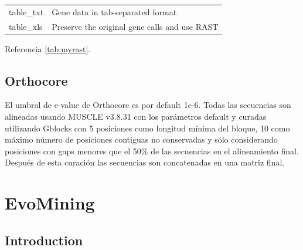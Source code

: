 \documentclass[12pt,twoside]{reedthesis}
\begin{document}
\begin{longtable}[]{@{}ll@{}}
  \begin{minipage}[t]{0.22\columnwidth}\raggedright\strut
  table\_txt\strut
  \end{minipage} & \begin{minipage}[t]{0.72\columnwidth}\raggedright\strut
  Gene data in tab-separated format\strut
  \end{minipage}\tabularnewline
  \begin{minipage}[t]{0.22\columnwidth}\raggedright\strut
  table\_xls\strut
  \end{minipage} & \begin{minipage}[t]{0.72\columnwidth}\raggedright\strut
  Preserve the original gene calls and use RAST\strut
  \end{minipage}\tabularnewline
  \bottomrule
  \end{longtable}
  
  Referencia \autoref{tab:myrast}.
  
  \section{Orthocore}\label{orthocore}
  
  El umbral de e-value de Orthocore es por default 1e-6. Todas las
  secuencias son alineadas usando MUSCLE v3.8.31 con los parámetros
  default y curadas utilizando Gblocks con 5 posiciones como longitud
  mínima del bloque, 10 como máximo número de posiciones contiguas no
  conservadas y sólo considerando posiciones con gaps menores que el 50\%
  de las secuencias en el alineamiento final. Después de esta curación las
  secuencias son concatenadas en una matriz final.
  
  \chapter{EvoMining}\label{evomining}
  
  \section{Introduction}\label{introduction}
  
\end{document}
